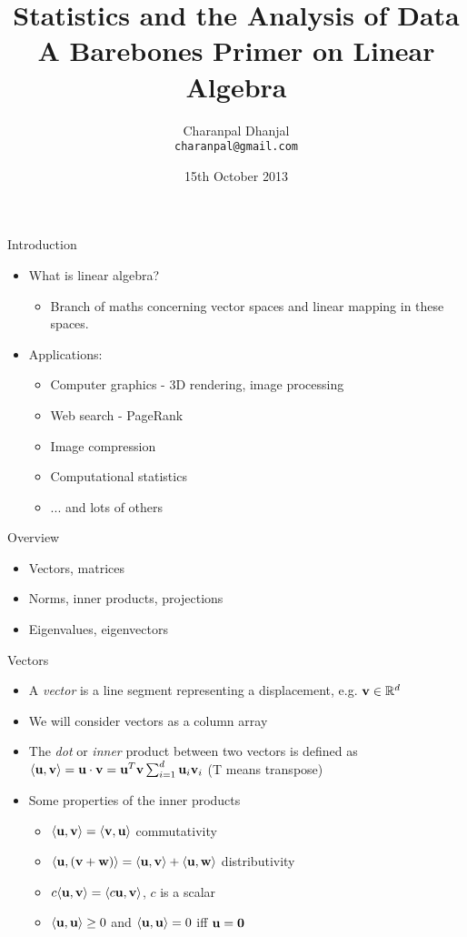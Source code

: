 \documentclass{beamer}
\title{Statistics and the Analysis of Data\\ A Barebones Primer on Linear Algebra}
\author{Charanpal Dhanjal \\ \texttt{charanpal@gmail.com}}
\institute{\'{E}cole des Ponts}
\date{15th October 2013}
\begin{document}
\frame{\titlepage}

\begin{frame}{Introduction}
\begin{itemize} 
 \item What is linear algebra? 
 \begin{itemize}
 \item Branch of maths concerning vector spaces and linear mapping in these spaces. 
 \end{itemize} 
 \item Applications: 
 \begin{itemize}
 \item Computer graphics - 3D rendering, image processing  
 \item Web search - PageRank
 \item Image compression 
 \item Computational statistics 
 \item ... and lots of others 
 \end{itemize} 
\end{itemize}

\end{frame}


\begin{frame}{Overview} 
\begin{itemize}
 \item Vectors, matrices 
 \item Norms, inner products, projections  
 \item Eigenvalues, eigenvectors 
\end{itemize} 
\end{frame}

\begin{frame}{Vectors}
\begin{itemize} 
 \item A \emph{vector} is a line segment representing a displacement, e.g. $\textbf{v} \in \mathbb{R}^d$ 
 \item We will consider vectors as a column array 
 \item The \emph{dot} or \emph{inner} product between two vectors is defined as $\langle \textbf{u}, \textbf{v} \rangle = \textbf{u} \cdot \textbf{v} = \textbf{u}^T\textbf{v} \sum_{i=1}^d \textbf{u}_i\textbf{v}_i$ (T means transpose)
 \item Some properties of the inner products
 \begin{itemize}
 \item $\langle \textbf{u}, \textbf{v} \rangle = \langle \textbf{v}, \textbf{u} \rangle$ commutativity 
 \item $\langle \textbf{u}, (\textbf{v} + \textbf{w}) \rangle = \langle \textbf{u}, \textbf{v} \rangle + \langle \textbf{u}, \textbf{w} \rangle$ distributivity 
 \item $c \langle \textbf{u}, \textbf{v} \rangle = \langle c \textbf{u}, \textbf{v} \rangle$, $c$ is a scalar 
 \item $ \langle \textbf{u}, \textbf{u} \rangle \geq 0$ and $ \langle \textbf{u}, \textbf{u} \rangle = 0$ iff $\textbf{u} = \textbf{0}$  
 \end{itemize} 
\end{itemize}
\end{frame}
\end{document}

